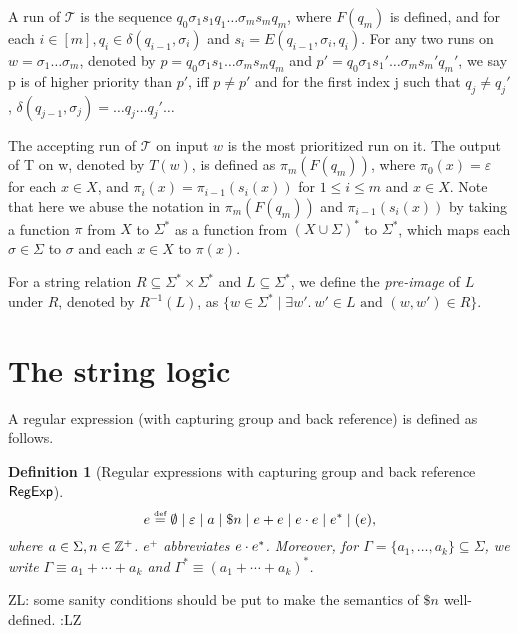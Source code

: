 \documentclass[sigplan,review,anonymous]{acmart}\settopmatter{printfolios=true,printccs=false,printacmref=false}
\newcommand{\zhilin}[1]{\color{brown} {ZL: #1 :LZ} \color{black}}
\newcommand{\zhilin}[1]{}
\newcommand{\tmop}[1]{\ensuremath{\operatorname{#1}}}
\newtheorem{definition}{Definition}
\newcommand\NSST{{\sf NSST}}
\newcommand\psst{\mathcal{T}}
\begin{document}
  A run of $\psst$ is the sequence $q_0 \sigma_1 s_1 q_1 \ldots \sigma_m s_m q_m$,
  where $F (q_m)$ is defined, and for each $i \in [m], q_i \in \delta (q_{i-1}, \sigma_i)$ and $s_i = E (q_{i - 1}, \sigma_i, q_i)$. For any two runs on $w = \sigma_1 \ldots \sigma_m$, denoted by $p = q_0 \sigma_1 s_1 \ldots \sigma_m s_m q_m$ and $p' = q_0 \sigma_1
  s_1' \ldots \sigma_m s_m' q_m'$, we say p is of higher priority than
  $p'$, iff $p \neq p'$ and for the first index j such that $q_j \neq q_j'$,
  $\delta (q_{j - 1}, \sigma_j) = \ldots q_j \ldots q_j' \ldots$
  
  The accepting run of $\psst$ on input $w$ is the most prioritized run on it. The output of T on w, denoted by $T(w)$, is defined as $\pi_m(F(q_m))$, where $\pi_0(x) = \varepsilon$ for each $x \in X$, and $\pi_{i}(x) = \pi_{i-1}(s_{i}(x))$ for $1 \le i \le m$ and $x \in X$. Note that here we abuse the notation in $\pi_m(F(q_m))$ and $\pi_{i-1}(s_{i}(x))$ by taking a function $\pi$ from $X$ to $\Sigma^*$ as a function from $(X \cup \Sigma)^*$ to $\Sigma^*$, which maps each $\sigma \in \Sigma$ to $\sigma$ and each $x \in X$ to $\pi(x)$.  
  
  

For a string relation $R \subseteq \Sigma^* \times \Sigma^*$ and $L \subseteq \Sigma^*$, we define the \emph{pre-image} of $L$ under $R$, denoted by $R^{-1}(L)$, as $\{w \in \Sigma^* \mid \exists w'.\ w' \in L \mbox{ and } (w, w') \in R\}$. 
 


\section{The string logic}


A regular expression (with capturing group and back reference) is defined as follows.

\begin{definition}[Regular expressions with capturing group and back reference ${\sf RegExp}$]
	\[e \eqdef \emptyset \mid \varepsilon \mid a \mid \$n \mid e + e \mid e \concat e \mid e^* \mid (e)  , \]
where $a \in \Sigma, n \in \mathbb{Z}^+$. 
$e^+$ abbreviates $e \cdot e^*$. Moreover, for $\Gamma = \{a_1, \ldots, a_k\}\subseteq \Sigma$, we write $\Gamma \equiv a_1 + \cdots + a_k$ and $\Gamma^\ast \equiv (a_1 + \cdots + a_k)^\ast$. 
\end{definition}
\zhilin{some sanity conditions should be put to make the semantics of $\$ n$ well-defined.}
\end{document}
